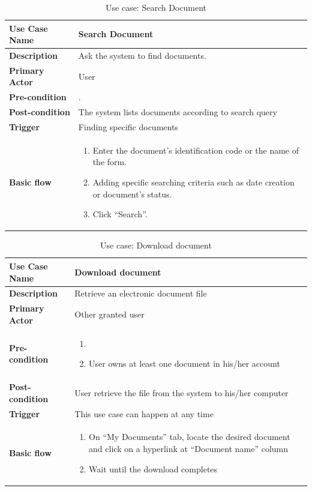 \begin{table}
	\centering
	\caption{Use case: Search Document}
	\begin{tabular}{|l|L{9cm}|}
		\hline
		\textbf{Use Case Name} & Search Document \\
		\hline
		
		\textbf{Description} & Ask the system to find documents. \\
		\textbf{Primary Actor} & User \\
		\textbf{Pre-condition} & \alreadylogin. \\
		\textbf{Post-condition} & The system lists documents according to search query \\
		\textbf{Trigger} & Finding specific documents \\
		\textbf{Basic flow} & 
		\begin{enumerate}
			\item Enter the document's identification code or the name of the form.
			\item Adding specific searching criteria such as date creation or document's status.
			\item Click \enquote{Search}.
		\end{enumerate} \\
		\hline
	\end{tabular}
\end{table}

\begin{table}
	\centering
	\caption{Use case: Download document}
	\label{tbl:usecase-last}
	\begin{tabular}{|l|L{9cm}|}
		\hline
		\textbf{Use Case Name} & Download document \\
		\hline
		
		\textbf{Description} &  Retrieve an electronic document file \\
		\textbf{Primary Actor} & Other granted user \\
		\textbf{Pre-condition} & 
		\begin{enumerate}
			\item \alreadylogin
			\item User owns at least one document in his/her account
		\end{enumerate} \\
		\textbf{Post-condition} & User retrieve the file from the system to his/her computer \\
		\textbf{Trigger} & This use case can happen at any time \\
		\textbf{Basic flow} & 
		\begin{enumerate}
			\item On \enquote{My Documents} tab, locate the desired document and click on a hyperlink at \enquote{Document name} column
			\item Wait until the download completes
		\end{enumerate} \\
		\hline
	\end{tabular}
\end{table}
